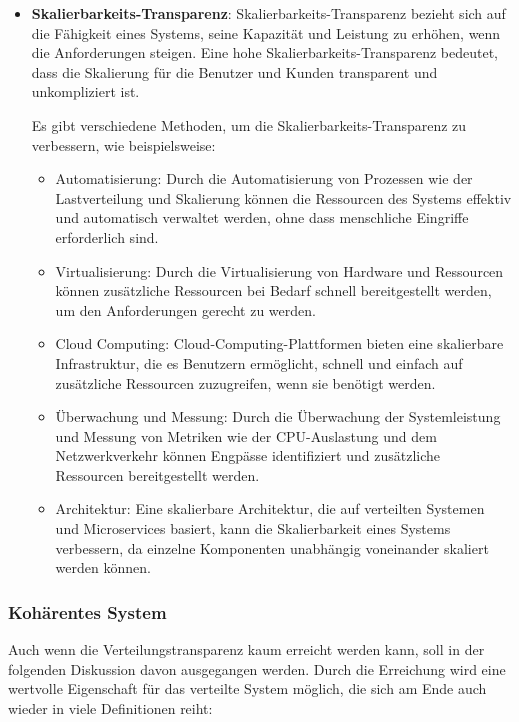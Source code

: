 \documentclass[../vs-script-first-v01.tex]{subfiles}
\begin{document}
\begin{itemize}
  \item \textbf{Skalierbarkeits-Transparenz}: Skalierbarkeits-Transparenz bezieht sich auf die Fähigkeit eines Systems, seine Kapazität und Leistung zu erhöhen, wenn die Anforderungen steigen. Eine hohe Skalierbarkeits-Transparenz bedeutet, dass die Skalierung für die Benutzer und Kunden transparent und unkompliziert ist.

        Es gibt verschiedene Methoden, um die Skalierbarkeits-Transparenz zu verbessern, wie beispielsweise:
        \begin{itemize}
          \item Automatisierung: Durch die Automatisierung von Prozessen wie der Lastverteilung und Skalierung können die Ressourcen des Systems effektiv und automatisch verwaltet werden, ohne dass menschliche Eingriffe erforderlich sind.
          \item Virtualisierung: Durch die Virtualisierung von Hardware und Ressourcen können zusätzliche Ressourcen bei Bedarf schnell bereitgestellt werden, um den Anforderungen gerecht zu werden.
          \item Cloud Computing: Cloud-Computing-Plattformen bieten eine skalierbare Infrastruktur, die es Benutzern ermöglicht, schnell und einfach auf zusätzliche Ressourcen zuzugreifen, wenn sie benötigt werden.
          \item Überwachung und Messung: Durch die Überwachung der Systemleistung und Messung von Metriken wie der CPU-Auslastung und dem Netzwerkverkehr können Engpässe identifiziert und zusätzliche Ressourcen bereitgestellt werden.
          \item Architektur: Eine skalierbare Architektur, die auf verteilten Systemen und Microservices basiert, kann die Skalierbarkeit eines Systems verbessern, da einzelne Komponenten unabhängig voneinander skaliert werden können.
        \end{itemize}

\end{itemize}
\subsubsection{Kohärentes System}
Auch wenn die Verteilungstransparenz kaum erreicht werden kann, soll in der folgenden Diskussion davon ausgegangen werden. Durch die Erreichung wird eine wertvolle Eigenschaft für das verteilte System möglich, die sich am Ende auch wieder in viele Definitionen reiht:
\end{document}
